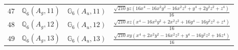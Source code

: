 \documentclass[fleqn,8pt,landscape]{jsarticle}
\begin{document}
\begin{table}[ht!]
\begin{center}
\begin{tabular}{cccl}
$ 47 $ & $ \mathbb{Q}_{6}(A_{g},11) $ & $ \mathbb{G}_{6}(A_{u},11) $ & $ \frac{\sqrt{210} y z \left(16 x^{4} - 16 x^{2} y^{2} - 16 x^{2} z^{2} + y^{4} + 2 y^{2} z^{2} + z^{4}\right)}{16} $ \\
$ 48 $ & $ \mathbb{Q}_{6}(A_{g},12) $ & $ \mathbb{G}_{6}(A_{u},12) $ & $ \frac{\sqrt{210} x z \left(x^{4} - 16 x^{2} y^{2} + 2 x^{2} z^{2} + 16 y^{4} - 16 y^{2} z^{2} + z^{4}\right)}{16} $ \\
$ 49 $ & $ \mathbb{Q}_{6}(A_{g},13) $ & $ \mathbb{G}_{6}(A_{u},13) $ & $ \frac{\sqrt{210} x y \left(x^{4} + 2 x^{2} y^{2} - 16 x^{2} z^{2} + y^{4} - 16 y^{2} z^{2} + 16 z^{4}\right)}{16} $ \\
 \hline \hline
\end{tabular}
\end{center}
\end{table}
\end{document}
